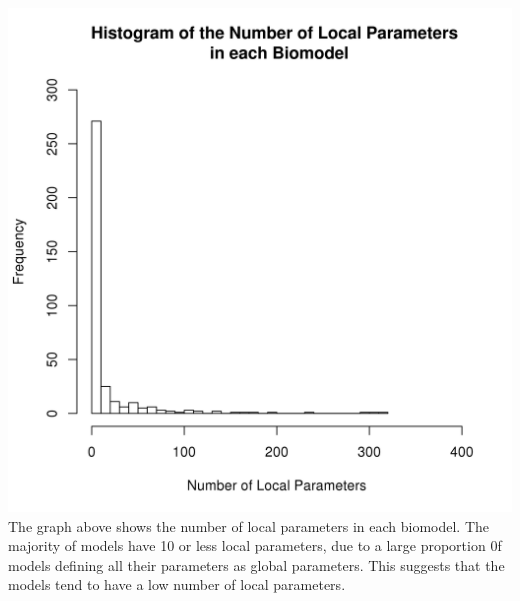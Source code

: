\documentclass[portrait,a1paper,fontscale=0.5]{baposter}
\begin{document}
\begin{poster}
{\begin{multicols}{2}
 
 \includegraphics[trim= 1.5mm 5mm 5mm 5mm, clip, scale=0.4]{Poster-images/LocalParametersHistogram.png} 
 The graph above shows the number of local parameters in each biomodel. The majority of models have 10 or less local parameters, due to a large proportion 0f models defining all their parameters as global parameters. This suggests that the models tend to have a low number of local parameters.
 \end{multicols}
 }
 
\end{poster}
\end{document}
